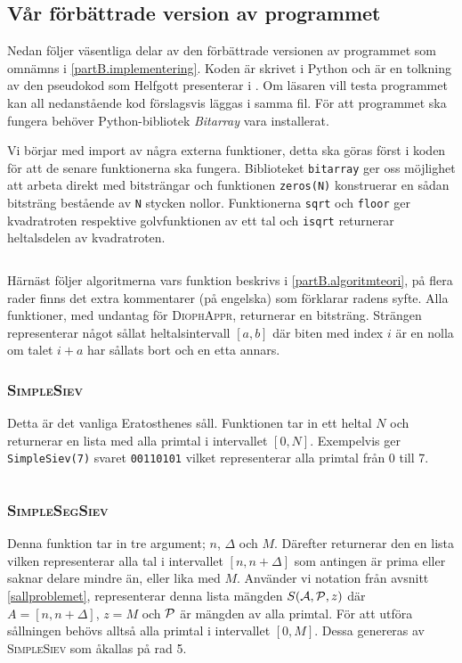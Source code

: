 
\newcommand{\code}[1]{\inputminted[frame=lines,fontsize=\footnotesize,linenos]{python}{code/#1.py}}

\subsection{Vår förbättrade version av programmet}
Nedan följer väsentliga delar av den förbättrade versionen av programmet som omnämns i \ref{partB.implementering}.
Koden är skrivet i Python och är en tolkning av den pseudokod som Helfgott presenterar i \cite{HaraldSieve}.
Om läsaren vill testa programmet kan all nedanstående kod förslagsvis läggas i samma fil. 
För att programmet ska fungera behöver Python-bibliotek \textit{Bitarray} vara installerat.


Vi börjar med import av några externa funktioner, detta ska göras först i koden för att de senare funktionerna ska fungera.
Biblioteket \texttt{bitarray} ger oss möjlighet att arbeta direkt med bitsträngar och funktionen \texttt{zeros(N)} konstruerar en sådan bitsträng bestående av \texttt{N} stycken nollor.
Funktionerna \texttt{sqrt} och \texttt{floor} ger kvadratroten respektive golvfunktionen av ett tal 
och \texttt{isqrt} returnerar heltalsdelen av kvadratroten.
\code{imports}


Härnäst följer algoritmerna vars funktion beskrivs i \ref{partB.algoritmteori}, 
på flera rader finns det extra kommentarer (på engelska) som förklarar radens syfte.
Alla funktioner, med undantag för \textsc{DiophAppr}, returnerar en bitsträng. Strängen representerar något sållat heltalsintervall $[a,b]$ 
där biten med index $i$ är en nolla om talet $i+a$ har sållats bort och en etta annars.


\subsubsection*{\textsc{SimpleSiev}}
Detta är det vanliga Eratosthenes såll. Funktionen tar in ett heltal $N$ och returnerar en lista med alla primtal i intervallet $[0,N]$.
Exempelvis ger \texttt{SimpleSiev(7)} svaret \texttt{00110101} vilket representerar alla primtal från 0 till 7.
\code{SimpleSiev} 


\subsubsection*{\textsc{SimpleSegSiev}}
Denna funktion tar in tre argument; $n$, $\Delta$ och $M$. Därefter returnerar den en lista vilken representerar alla tal i intervallet $[n, n+\Delta]$ som antingen är prima eller saknar delare mindre än, eller lika med $M$. Använder vi notation från avsnitt \ref{sallproblemet}, representerar denna lista mängden $\S{A}{P}{z}$ där $A=[n, n+\Delta]$, $z=M$ och $\P$ är mängden av alla primtal. 
För att utföra sållningen behövs alltså alla primtal i intervallet $[0,M]$. 
Dessa genereras av \textsc{SimpleSiev} som åkallas på rad 5.
\code{SimpleSegSiev}


